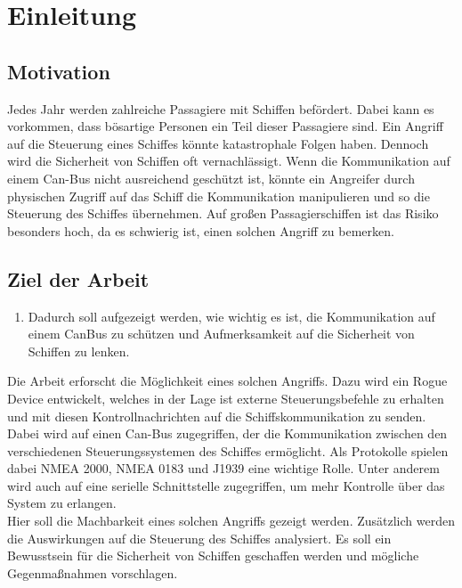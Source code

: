 \chapter{Einleitung}

\section{Motivation}
Jedes Jahr werden zahlreiche Passagiere mit Schiffen befördert. Dabei kann es vorkommen, dass bösartige Personen ein Teil dieser Passagiere sind.
Ein Angriff auf die Steuerung eines Schiffes könnte katastrophale Folgen haben. Dennoch wird die Sicherheit von Schiffen oft vernachlässigt.
Wenn die Kommunikation auf einem Can-Bus nicht ausreichend geschützt ist, könnte ein Angreifer durch physischen Zugriff auf das Schiff die 
Kommunikation manipulieren und so die Steuerung des Schiffes übernehmen. Auf großen Passagierschiffen ist das Risiko besonders hoch, da es
schwierig ist, einen solchen Angriff zu bemerken.


\section{Ziel der Arbeit}
\begin{enumerate}
    \item Dadurch soll aufgezeigt werden, wie wichtig es ist, die Kommunikation auf einem CanBus zu schützen
    und Aufmerksamkeit auf die Sicherheit von Schiffen zu lenken.
\end{enumerate}

Die Arbeit erforscht die Möglichkeit eines solchen Angriffs. Dazu wird ein Rogue Device entwickelt, welches in der 
Lage ist externe Steuerungsbefehle zu erhalten und mit diesen Kontrollnachrichten auf die Schiffskommunikation zu senden.
Dabei wird auf einen Can-Bus zugegriffen, der die Kommunikation zwischen den verschiedenen Steuerungssystemen des Schiffes 
ermöglicht. Als Protokolle spielen dabei NMEA 2000, NMEA 0183 und J1939 eine wichtige Rolle. Unter anderem wird auch 
auf eine serielle Schnittstelle zugegriffen, um mehr Kontrolle über das System zu erlangen. \\
Hier soll die Machbarkeit eines solchen Angriffs gezeigt werden. Zusätzlich werden die Auswirkungen auf die Steuerung des 
Schiffes analysiert. Es soll ein Bewusstsein für die Sicherheit von Schiffen geschaffen werden und mögliche Gegenmaßnahmen
vorschlagen.
